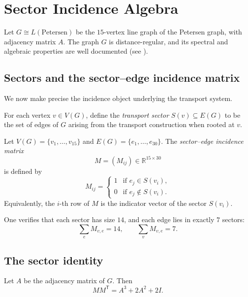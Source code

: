 \section{Sector Incidence Algebra}

Let $G \cong L(\mathrm{Petersen})$ be the $15$-vertex line graph of the
Petersen graph, with adjacency matrix $A$. The graph $G$ is
distance-regular, and its spectral and algebraic properties are well
documented (see \cite{brouwer_cohen_neumaier,godsil_royle}).

\subsection{Sectors and the sector--edge incidence matrix}

We now make precise the incidence object underlying the transport system.

\begin{definition}
For each vertex $v \in V(G)$, define the \emph{transport sector}
$S(v) \subseteq E(G)$ to be the set of edges of $G$ arising from the
transport construction when rooted at $v$.
\end{definition}

\begin{definition}
Let $V(G)=\{v_1,\dots,v_{15}\}$ and $E(G)=\{e_1,\dots,e_{30}\}$. The
\emph{sector--edge incidence matrix}
\[
M=(M_{ij}) \in \mathbb{R}^{15 \times 30}
\]
is defined by
\[
M_{ij} =
\begin{cases}
1 & \text{if } e_j \in S(v_i),\\
0 & \text{if } e_j \notin S(v_i).
\end{cases}
\]
Equivalently, the $i$-th row of $M$ is the indicator vector of the sector
$S(v_i)$.
\end{definition}

One verifies that each sector has size $14$, and each edge lies in exactly
$7$ sectors:
\[
\sum_e M_{v,e} = 14, \qquad
\sum_v M_{v,e} = 7.
\]

\subsection{The sector identity}

\begin{theorem}
Let $A$ be the adjacency matrix of $G$. Then
\[
M M^{\mathsf T} = A^3 + 2A^2 + 2I.
\]
\end{theorem}

